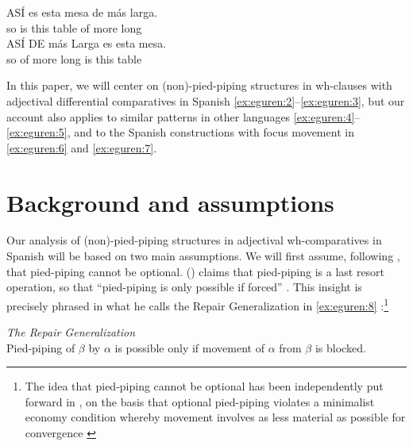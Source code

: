\documentclass[output=paper,colorlinks,citecolor=brown]{langscibook}
\begin{document}
\begin{exe} 
    \ex\label{ex:eguren:7} 
    \begin{xlist}
            \ex
\gll ASÍ	es	esta	mesa	de más	larga.\\
     so		is	this	table	of	more	long\\
            \ex
\gll ASÍ 	DE	más	Larga	es	esta	mesa.\\
    so		of		more	long		is	this	table\\
    \end{xlist}
\end{exe}

In this paper, we will center on (non)-pied-piping structures in wh-clauses with adjectival differential comparatives in Spanish \ref{ex:eguren:2}--\ref{ex:eguren:3}, but our account also applies to similar patterns in other languages \ref{ex:eguren:4}--\ref{ex:eguren:5}, and to the Spanish constructions with focus movement in \ref{ex:eguren:6} and \ref{ex:eguren:7}.

\section{Background and assumptions}
\label{sec:eguren:3}

Our analysis of (non)-pied-piping structures in adjectival wh-comparatives in Spanish will be based on two main assumptions. We will first assume, following \citet{heck2008pied,heck2009certain}, that pied-piping cannot be optional. \citeauthor{heck2008pied} (\citeyear{heck2008pied,heck2009certain}) claims that pied-piping is a last resort operation, so that ``pied-piping is only possible if forced'' \citep[257]{heck2008pied}. This insight is precisely phrased in what he calls the Repair Generalization in \ref{ex:eguren:8} \citep[117]{heck2008pied} \citep[92]{heck2009certain}:\footnote{The idea that pied-piping cannot be optional has been independently put forward in \cite{ocon2008movimiento}, on the basis that optional pied-piping violates a minimalist economy condition whereby movement involves as less material as possible for convergence \citep[262]{chomsky1995b}}

\begin{exe} 
    \ex\label{ex:eguren:8} 
   \textit{The Repair Generalization}\\
   Pied-piping of $\beta$ by $\alpha$ is possible only if movement of $\alpha$ from $\beta$ is blocked.\\
\end{exe}
\end{document}
